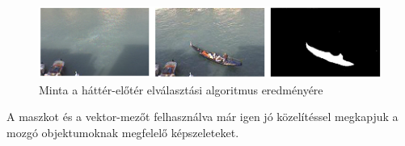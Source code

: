 \begin{figure}[tbh]
\centering
\includegraphics{figures/mog.png}
\caption{Minta a háttér-előtér elválasztási algoritmus eredményére \cite{mog-example} \label{fig:mog-example}}
\end{figure}

A maszkot és a vektor-mezőt felhasználva már igen jó közelítéssel megkapjuk a mozgó objektumoknak megfelelő képszeleteket.
